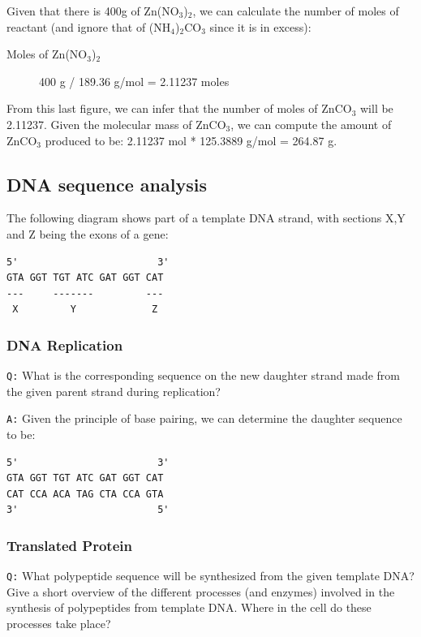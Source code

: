 \documentclass[11pt, a4paper,titlepage]{article}
\begin{document}
Given that there is 400g of Zn(NO$_{3}$)$_{2}$, we can calculate the
number of moles of reactant (and ignore that of (NH$_{4}$)$_{2}$CO$_{3}$
since it is in excess):

\begin{description}
\item[Moles of Zn(NO$_{3}$)$_{2}$] 400 g / 189.36 g/mol = 2.11237 moles
\end{description}

From this last figure, we can infer that the number of moles of
ZnCO$_{3}$ will be 2.11237. Given the molecular mass of ZnCO$_{3}$, we can
compute the amount of ZnCO$_{3}$ produced to be: 2.11237 mol * 125.3889
g/mol = 264.87 g.
\subsection{DNA sequence analysis}
\label{sec-1-2}


The following diagram shows part of a template DNA strand, with
sections X,Y and Z being the exons of a gene:


\begin{verbatim}
5'                        3'
GTA GGT TGT ATC GAT GGT CAT
---     -------         ---
 X         Y             Z
\end{verbatim}
\subsubsection{DNA Replication}
\label{sec-1-2-1}

\texttt{Q:} What is the corresponding sequence on the new daughter strand
made from the given parent strand during replication?

\texttt{A:} Given the principle of base pairing, we can determine the daughter
sequence to be:


\begin{verbatim}
5'                        3'
GTA GGT TGT ATC GAT GGT CAT
CAT CCA ACA TAG CTA CCA GTA
3'                        5'
\end{verbatim}
\subsubsection{Translated Protein}
\label{sec-1-2-2}

\texttt{Q:} What polypeptide sequence will be synthesized from the given template
DNA? Give a short overview of the different processes (and enzymes)
involved in the synthesis of polypeptides from template DNA. Where in
the cell do these processes take place?
\end{document}
